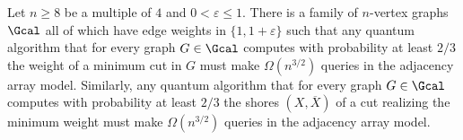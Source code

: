 \begin{theorem}
\label{thm:adjlower2}
Let $n \ge 8$ be a multiple of $4$ and $0 < \varepsilon \le 1$.  There is a family of $n$-vertex graphs $\Gcal$ all of which have edge weights in $\{1,1+\varepsilon\}$ 
such that any quantum algorithm that for every graph $G \in \Gcal$ computes with probability at least $2/3$ the weight of a minimum cut in $G$ must make 
$\Omega(n^{3/2})$ queries in the adjacency array model.  Similarly, any quantum algorithm that for every graph $G \in \Gcal$ computes with 
probability at least $2/3$ the shores $(X,\overline{X})$ of a cut realizing the minimum weight must make $\Omega(n^{3/2})$ queries in the adjacency array model.
\end{theorem}
